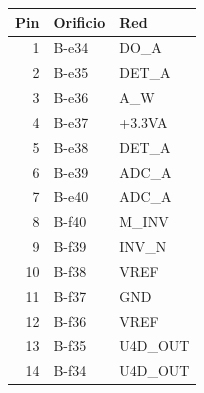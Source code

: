 \begin{tabular}{r l p{39mm}}
\toprule Pin & Orificio & Red\\\midrule
1 & B-e34 & DO\_A\\
2 & B-e35 & DET\_A\\
3 & B-e36 & A\_W\\
4 & B-e37 & +3.3VA\\
5 & B-e38 & DET\_A\\
6 & B-e39 & ADC\_A\\
7 & B-e40 & ADC\_A\\
8 & B-f40 & M\_INV\\
9 & B-f39 & INV\_N\\
10 & B-f38 & VREF\\
11 & B-f37 & GND\\
12 & B-f36 & VREF\\
13 & B-f35 & U4D\_OUT\\
14 & B-f34 & U4D\_OUT\\
\bottomrule\end{tabular}
